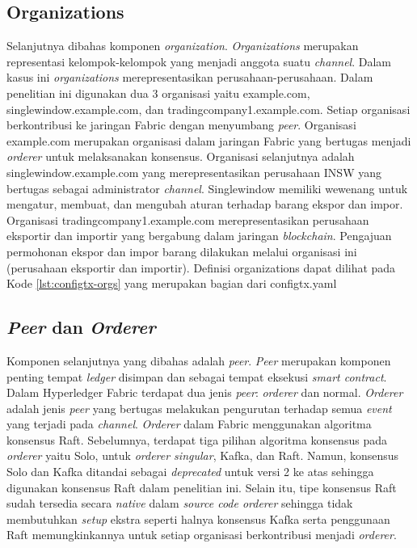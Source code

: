 \subsection{Organizations}
\label{subsec:organization}

Selanjutnya dibahas komponen \textit{organization}. \textit{Organizations} merupakan representasi kelompok-kelompok yang menjadi anggota suatu \textit{channel}. Dalam kasus ini \textit{organizations} merepresentasikan perusahaan-perusahaan. Dalam penelitian ini digunakan dua 3 organisasi yaitu example.com, singlewindow.example.com, dan tradingcompany1.example.com. Setiap organisasi berkontribusi ke jaringan Fabric dengan menyumbang \textit{peer}. Organisasi example.com merupakan organisasi dalam jaringan Fabric yang bertugas menjadi \textit{orderer} untuk melaksanakan konsensus. Organisasi selanjutnya adalah singlewindow.example.com yang merepresentasikan perusahaan INSW yang bertugas sebagai administrator \textit{channel}. Singlewindow memiliki wewenang untuk mengatur, membuat, dan mengubah aturan terhadap barang ekspor dan impor. Organisasi tradingcompany1.example.com merepresentasikan perusahaan eksportir dan importir yang bergabung dalam jaringan \textit{blockchain}. Pengajuan permohonan ekspor dan impor barang dilakukan melalui organisasi ini (perusahaan eksportir dan importir). Definisi organizations dapat dilihat pada Kode \ref{lst:configtx-orgs} yang merupakan bagian dari configtx.yaml




\subsection{\textit{Peer} dan \textit{Orderer}}
\label{subsec:peer-orderer}

Komponen selanjutnya yang dibahas adalah \textit{peer}. \textit{Peer} merupakan komponen penting tempat \textit{ledger} disimpan dan sebagai tempat eksekusi \textit{smart contract}. Dalam Hyperledger Fabric terdapat dua jenis \textit{peer}: \textit{orderer} dan normal. \textit{Orderer} adalah jenis \textit{peer} yang bertugas melakukan pengurutan terhadap semua \textit{event} yang terjadi pada \textit{channel}. \textit{Orderer} dalam Fabric menggunakan algoritma konsensus Raft. Sebelumnya, terdapat tiga pilihan algoritma konsensus pada \textit{orderer} yaitu Solo, untuk \textit{orderer singular}, Kafka, dan Raft. Namun, konsensus Solo dan Kafka ditandai sebagai \textit{deprecated} untuk versi 2 ke atas sehingga digunakan konsensus Raft dalam penelitian ini. Selain itu, tipe konsensus Raft sudah tersedia secara \textit{native} dalam \textit{source code orderer} sehingga tidak membutuhkan \textit{setup} ekstra seperti halnya konsensus Kafka serta penggunaan Raft memungkinkannya untuk setiap organisasi berkontribusi menjadi \textit{orderer}.

